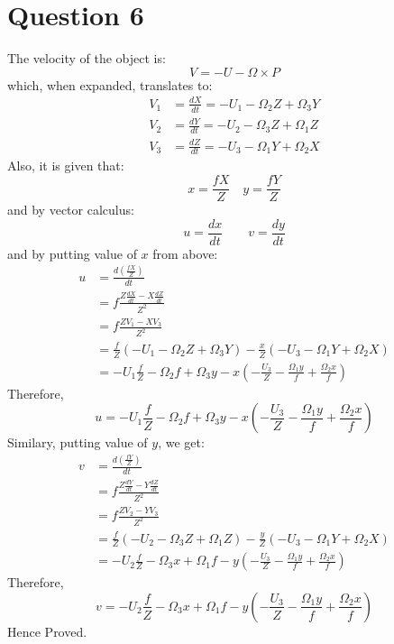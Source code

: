 \documentclass{article}
\begin{document}
\section*{Question 6}
The velocity of the object is:
$$ V = -U-\Omega \times P $$
which, when expanded, translates to:
\begin{align*}
V_1 &= \frac{dX}{dt} = -U_1 - \Omega_2Z + \Omega_3Y \\
V_2 &= \frac{dY}{dt} = -U_2 - \Omega_3Z + \Omega_1Z \\
V_3 &= \frac{dZ}{dt} = -U_3 - \Omega_1Y + \Omega_2X 
\end{align*}
Also, it is given that:
$$
x=\frac{fX}{Z} \quad y = \frac{fY}{Z}
$$
and by vector calculus:
$$
u = \frac{dx}{dt} \qquad v = \frac{dy}{dt}
$$
and by putting value of $x$ from above:
\begin{align*}
  u &= \frac{d(\frac{fX}{Z})}{dt} \\
    &= f\frac{Z\frac{dX}{dt} - X\frac{dZ}{dt}}{Z^2} \\
    &= f\frac{ZV_1 - XV_3}{Z^2} \\
    &= \frac{f}{Z}(-U_1 - \Omega_2Z + \Omega_3Y) - \frac{x}{Z}(-U_3 - \Omega_1Y + \Omega_2X)\\
    &= -U_1\frac{f}{Z} - \Omega_2f + \Omega_3y - x (-\frac{U_3}{Z} - \frac{\Omega_1y}{f}+\frac{\Omega_2x}{f})
\end{align*}
Therefore,\\
$$u = -U_1\frac{f}{Z} - \Omega_2f + \Omega_3y - x (-\frac{U_3}{Z} - \frac{\Omega_1y}{f}+\frac{\Omega_2x}{f})$$
Similary, putting value of $y$, we get:
\begin{align*}
  v &= \frac{d(\frac{fY}{Z})}{dt} \\
    &= f\frac{Z\frac{dY}{dt} - Y\frac{dZ}{dt}}{Z^2} \\
    &= f\frac{ZV_2 - YV_3}{Z^2} \\
    &= \frac{f}{Z}(-U_2 - \Omega_3Z + \Omega_1Z) - \frac{y}{Z}(-U_3 - \Omega_1Y + \Omega_2X)\\
    &= -U_2\frac{f}{Z} - \Omega_3x + \Omega_1f - y (-\frac{U_3}{Z} - \frac{\Omega_1y}{f}+\frac{\Omega_2x}{f})
\end{align*}
Therefore,\\
$$v = -U_2\frac{f}{Z} - \Omega_3x + \Omega_1f - y (-\frac{U_3}{Z} - \frac{\Omega_1y}{f}+\frac{\Omega_2x}{f})$$
Hence Proved.

\pagebreak
\end{document}
